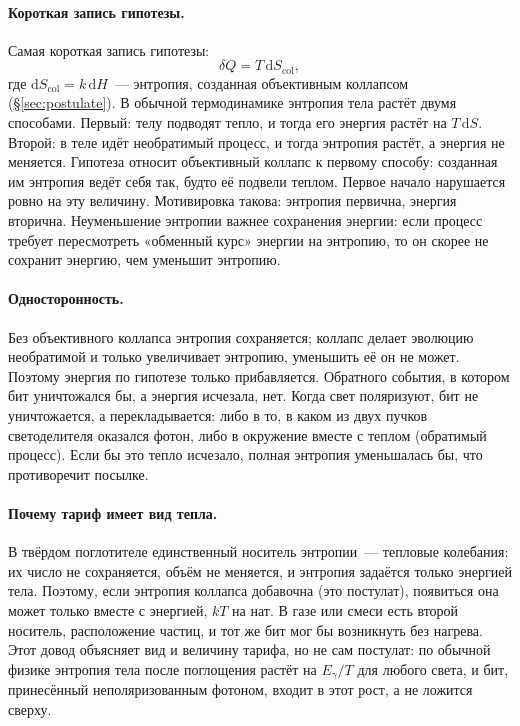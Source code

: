 \documentclass[11pt,a4paper]{article}
\newcommand{\Sref}[1]{\hyperref[#1]{\S\ref{#1}}}
\begin{document}
\paragraph{Короткая запись гипотезы.}
Самая короткая запись гипотезы:
\begin{equation}
\delta Q = T\,\mathrm{d}S_{\mathrm{col}},
\label{eq:dq_tds}
\end{equation}
где $\mathrm{d}S_{\mathrm{col}}=k\,\mathrm{d}H$~--- энтропия, созданная объективным коллапсом (\Sref{sec:postulate}). В обычной термодинамике энтропия тела растёт двумя способами. Первый: телу подводят тепло, и тогда его энергия растёт на $T\,\mathrm{d}S$. Второй: в теле идёт необратимый процесс, и тогда энтропия растёт, а энергия не меняется. Гипотеза относит объективный коллапс к первому способу: созданная им энтропия ведёт себя так, будто её подвели теплом. Первое начало нарушается ровно на эту величину. Мотивировка такова: энтропия первична, энергия вторична. Неуменьшение энтропии важнее сохранения энергии: если процесс требует пересмотреть «обменный курс» энергии на энтропию, то он скорее не сохранит энергию, чем уменьшит энтропию.

\paragraph{Односторонность.}
Без объективного коллапса энтропия сохраняется; коллапс делает эволюцию необратимой и только увеличивает энтропию, уменьшить её он не может. Поэтому энергия по гипотезе только прибавляется. Обратного события, в котором бит уничтожался бы, а энергия исчезала, нет. Когда свет поляризуют, бит не уничтожается, а перекладывается: либо в то, в каком из двух пучков светоделителя оказался фотон, либо в окружение вместе с теплом (обратимый процесс). Если бы это тепло исчезало, полная энтропия уменьшалась бы, что противоречит посылке.

\paragraph{Почему тариф имеет вид тепла.}
В твёрдом поглотителе единственный носитель энтропии~--- тепловые колебания: их число не сохраняется, объём не меняется, и энтропия задаётся только энергией тела. Поэтому, если энтропия коллапса добавочна (это постулат), появиться она может только вместе с энергией, $kT$ на нат. В газе или смеси есть второй носитель, расположение частиц, и тот же бит мог бы возникнуть без нагрева. Этот довод объясняет вид и величину тарифа, но не сам постулат: по обычной физике энтропия тела после поглощения растёт на $E_\gamma/T$ для любого света, и бит, принесённый неполяризованным фотоном, входит в этот рост, а не ложится сверху.
\end{document}
